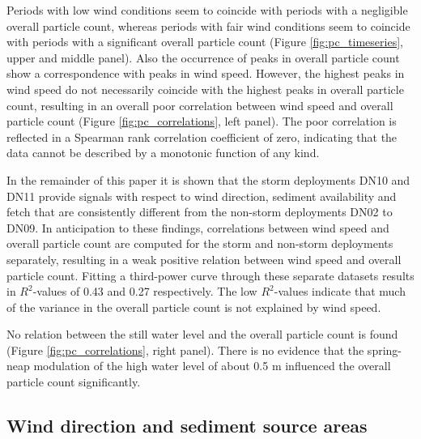 Periods with low wind conditions seem to coincide with periods with a
negligible overall particle count, whereas periods with fair wind
conditions seem to coincide with periods with a significant overall
particle count (Figure \ref{fig:pc_timeseries}, upper and middle
panel). Also the occurrence of peaks in overall particle count show a
correspondence with peaks in wind speed. However, the highest peaks in
wind speed do not necessarily coincide with the highest peaks in
overall particle count, resulting in an overall poor correlation
between wind speed and overall particle count (Figure
\ref{fig:pc_correlations}, left panel). The poor correlation is
reflected in a Spearman rank correlation coefficient
\citep{Spearman1904} of zero, indicating that the data cannot be
described by a monotonic function of any kind.

In the remainder of this paper it is shown that the storm deployments
DN10 and DN11 provide signals with respect to wind direction, sediment
availability and fetch that are consistently different from the
non-storm deployments DN02 to DN09. In anticipation to these findings,
correlations between wind speed and overall particle count are
computed for the storm and non-storm deployments separately, resulting
in a weak positive relation between wind speed and overall particle
count. Fitting a third-power curve through these separate datasets
results in $R^2$-values of 0.43 and 0.27 respectively. The low
$R^2$-values indicate that much of the variance in the overall
particle count is not explained by wind speed.

No relation between the still water level and the overall particle
count is found (Figure \ref{fig:pc_correlations}, right panel). There
is no evidence that the spring-neap modulation of the high water level
of about 0.5 m influenced the overall particle count significantly.

\subsection{Wind direction and sediment source areas}

